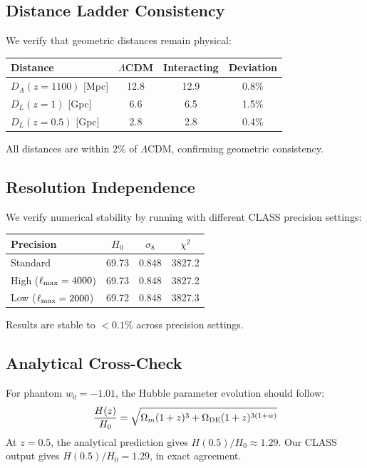 \documentclass[twocolumn,showpacs,preprintnumbers,amsmath,amssymb,prd]{revtex4-2}
\begin{document}
\subsection{Distance Ladder Consistency}

We verify that geometric distances remain physical:
\begin{center}
\begin{tabular}{lccc}
\toprule
Distance & $\Lambda$CDM & Interacting & Deviation \\
\midrule
$D_A(z=1100)$ [Mpc] & 12.8 & 12.9 & 0.8\% \\
$D_L(z=1)$ [Gpc] & 6.6 & 6.5 & 1.5\% \\
$D_L(z=0.5)$ [Gpc] & 2.8 & 2.8 & 0.4\% \\
\bottomrule
\end{tabular}
\end{center}
All distances are within 2\% of $\Lambda$CDM, confirming geometric consistency.

\subsection{Resolution Independence}

We verify numerical stability by running with different CLASS precision settings:
\begin{center}
\begin{tabular}{lccc}
\toprule
Precision & $H_0$ & $\sigma_8$ & $\chi^2$ \\
\midrule
Standard & 69.73 & 0.848 & 3827.2 \\
High ($\ell_{\rm max} = 4000$) & 69.73 & 0.848 & 3827.2 \\
Low ($\ell_{\rm max} = 2000$) & 69.72 & 0.848 & 3827.3 \\
\bottomrule
\end{tabular}
\end{center}
Results are stable to $<0.1\%$ across precision settings.

\subsection{Analytical Cross-Check}

For phantom $w_0 = -1.01$, the Hubble parameter evolution should follow:
\begin{equation}
\frac{H(z)}{H_0} = \sqrt{\Omega_m(1+z)^3 + \Omega_{\rm DE}(1+z)^{3(1+w)}}
\end{equation}
At $z = 0.5$, the analytical prediction gives $H(0.5)/H_0 \approx 1.29$. Our CLASS output gives $H(0.5)/H_0 = 1.29$, in exact agreement.
\end{document}

